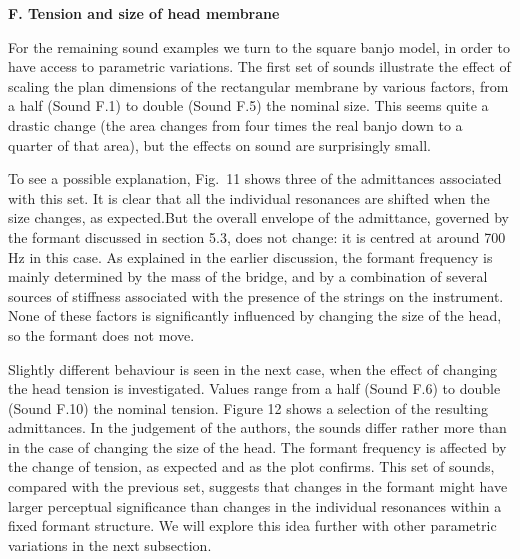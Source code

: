 

  \textbf{F. Tension and size of head membrane} 

  For the remaining sound examples we turn to the square banjo model, in order 
  to have access to parametric variations. The first set of sounds illustrate 
  the effect of scaling the plan dimensions of the rectangular membrane by 
  various factors, from a half (Sound F.1) to double (Sound F.5) the nominal 
  size. This seems quite a drastic change (the area changes from four times the 
  real banjo down to a quarter of that area), but the effects on sound are 
  surprisingly small. 

\audio{}

\audio{}

\audio{}

\audio{}

\audio{}

  To see a possible explanation, Fig.\ 11 shows three of the admittances 
  associated with this set. It is clear that all the individual resonances are 
  shifted when the size changes, as expected.But the overall envelope of the 
  admittance, governed by the formant discussed in section 5.3, does not 
  change: it is centred at around 700 Hz in this case. As explained in the 
  earlier discussion, the formant frequency is mainly determined by the mass of 
  the bridge, and by a combination of several sources of stiffness associated 
  with the presence of the strings on the instrument. None of these factors is 
  significantly influenced by changing the size of the head, so the formant 
  does not move. 


  Slightly different behaviour is seen in the next case, when the effect of 
  changing the head tension is investigated. Values range from a half (Sound 
  F.6) to double (Sound F.10) the nominal tension. Figure 12 shows a selection 
  of the resulting admittances. In the judgement of the authors, the sounds 
  differ rather more than in the case of changing the size of the head. The 
  formant frequency is affected by the change of tension, as expected and as 
  the plot confirms. This set of sounds, compared with the previous set, 
  suggests that changes in the formant might have larger perceptual 
  significance than changes in the individual resonances within a fixed formant 
  structure. We will explore this idea further with other parametric variations 
  in the next subsection. 

